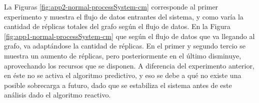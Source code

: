%
%
%
%
%


La Figuras \ref{fig:app2-normal-processSystem-cm} \normalsize{corresponde al primer experimento y muestra el flujo de datos entrantes del sistema, y como varía la cantidad de réplicas totales del grafo según el flujo de datos.} En la Figura \ref{fig:app1-normal-processSystem-cm} \normalsize{que según el flujo de datos que va llegando al grafo, va adaptándose la cantidad de réplicas. En el primer y segundo tercio se muestra un aumento de réplicas, pero posteriormente en el último disminuye, aprovechando los recursos que se disponen. A diferencia del experimento anterior, en éste no se activa el algoritmo predictivo, y eso se debe a qué no existe una posible sobrecarga a futuro, dado que se estabiliza el sistema antes de este análisis dado el algoritmo reactivo.}

